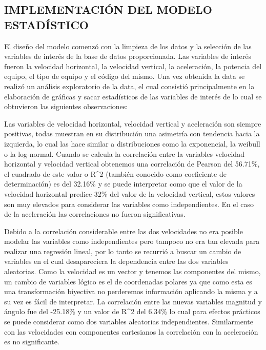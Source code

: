 \subsection{IMPLEMENTACIÓN DEL MODELO ESTADÍSTICO}

El diseño del modelo comenzó con la limpieza de los datos y la selección de las
variables de interés de la base de datos proporcionada. Las variables de
interés fueron la velocidad horizontal, la velocidad vertical, la aceleración,
la potencia del equipo, el tipo de equipo y el código del mismo. Una vez
obtenida la data se realizó un análisis exploratorio de la data, el cual
consistió principalmente en la elaboración de gráficas y sacar estadísticos de
las variables de interés de lo cual se obtuvieron las siguientes observaciones:

Las variables de velocidad horizontal, velocidad vertical y aceleración son
siempre positivas, todas muestran en su distribución una asimetría con
tendencia hacia la izquierda, lo cual las hace similar a distribuciones como la
exponencial, la weibull o la log-normal. Cuando se calcula la correlación entre
la variables velocidad horizontal y velocidad vertical obtenemos una
correlación de Pearson del 56.71\%, el cuadrado de este valor o R^2 (también
conocido como coeficiente de determinación) es del 32.16\% y se puede
interpretar como que el valor de la velocidad horizontal predice 32\% del valor
de la velocidad vertical, estos valores son muy elevados para considerar las
variables como independientes. En el caso de la aceleración las correlaciones
no fueron significativas.

Debido a la correlación considerable entre las dos velocidades no era posible
modelar las variables como independientes pero tampoco no era tan elevada para
realizar una regresión lineal, por lo tanto se recurrió a buscar un cambio de
variables en el cual desapareciera la dependencia entre las dos variables
aleatorias. Como la velocidad es un vector y tenemos las componentes del mismo,
un cambio de variables lógico es el de coordenadas polares ya que como esta es
una transformación biyectiva no perderemos información aplicando la misma y a
su vez es fácil de interpretar. La correlación entre las nuevas variables
magnitud y ángulo fue del -25.18\% y un valor de R^2 del 6.34\% lo cual para
efectos prácticos se puede considerar como dos variables aleatorias
independientes. Similarmente con las velocidades con componentes cartesianos la
correlación con la aceleración es no significante.

